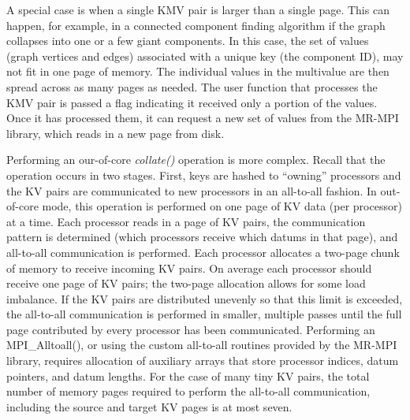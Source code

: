A special case is when a single KMV pair is larger than a single page.
This can happen, for example, in a connected component finding
algorithm if the graph collapses into one or a few giant components.
In this case, the set of values (graph vertices and edges) associated
with a unique key (the component ID), may not fit in one page of
memory.  The individual values in the multivalue are then spread
across as many pages as needed.  The user function that processes the
KMV pair is passed a flag indicating it received only a portion of the
values.  Once it has processed them, it can request a new set of
values from the MR-MPI library, which reads in a new page from disk.

Performing an our-of-core {\it collate()} operation is more complex.
Recall that the operation occurs in two stages.  First, keys are
hashed to ``owning'' processors and the KV pairs are communicated to
new processors in an all-to-all fashion.  In out-of-core mode, this
operation is performed on one page of KV data (per processor) at a
time.  Each processor reads in a page of KV pairs, the communication
pattern is determined (which processors receive which datums in that
page), and all-to-all communication is performed.  Each processor
allocates a two-page chunk of memory to receive incoming KV pairs.  On
average each processor should receive one page of KV pairs; the
two-page allocation allows for some load imbalance.  If the KV pairs
are distributed unevenly so that this limit is exceeded, the
all-to-all communication is performed in smaller, multiple passes
until the full page contributed by every processor has been
communicated.  Performing an MPI\_Alltoall(), or using the custom
all-to-all routines provided by the MR-MPI library, requires
allocation of auxiliary arrays that store processor indices, datum
pointers, and datum lengths.  For the case of many tiny KV pairs, the
total number of memory pages required to perform the all-to-all
communication, including the source and target KV pages is at most
seven.

